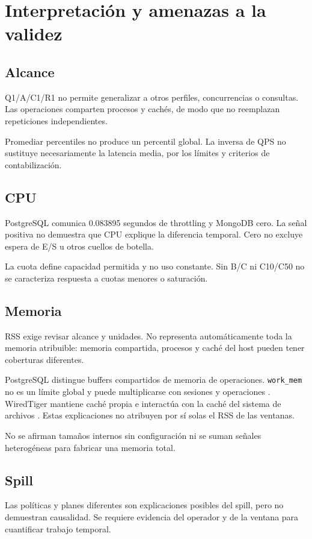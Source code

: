 \section{Interpretación y amenazas a la validez}
\subsection{Alcance}
Q1/A/C1/R1 no permite generalizar a otros perfiles, concurrencias o
consultas. Las operaciones comparten procesos y cachés, de modo que no
reemplazan repeticiones independientes.

Promediar percentiles no produce un percentil global. La inversa de QPS
no sustituye necesariamente la latencia media, por los límites y
criterios de contabilización.

\subsection{CPU}
PostgreSQL comunica 0.083895 segundos de throttling y MongoDB cero.
La señal positiva no demuestra que CPU explique la diferencia temporal.
Cero no excluye espera de E/S u otros cuellos de botella.

La cuota define capacidad permitida y no uso constante. Sin B/C ni
C10/C50 no se caracteriza respuesta a cuotas menores o saturación.

\subsection{Memoria}
RSS exige revisar alcance y unidades. No representa automáticamente toda
la memoria atribuible: memoria compartida, procesos y caché del host
pueden tener coberturas diferentes.

PostgreSQL distingue buffers compartidos de memoria de operaciones.
\texttt{work\_mem} no es un límite global y puede multiplicarse con
sesiones y operaciones \cite{pgmemory}. WiredTiger mantiene caché propia
e interactúa con la caché del sistema de archivos \cite{wiredtiger}.
Estas explicaciones no atribuyen por sí solas el RSS de las ventanas.

No se afirman tamaños internos sin configuración ni se suman señales
heterogéneas para fabricar una memoria total.

\subsection{Spill}
Las políticas y planes diferentes son explicaciones posibles del spill,
pero no demuestran causalidad. Se requiere evidencia del operador
y de la ventana para cuantificar trabajo temporal.

